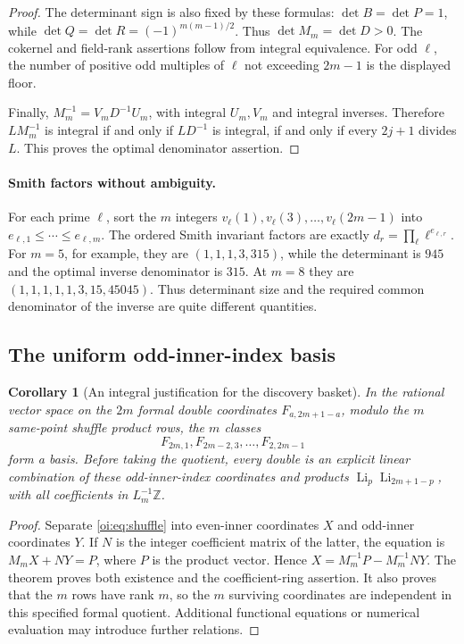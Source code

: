 \documentclass[11pt,letterpaper]{article}
\newtheorem{corollary}[theorem]{Corollary}
\theoremstyle{definition}
\theoremstyle{remark}
\begin{document}
\begin{proof}
The determinant sign is also fixed by these formulas:
$\det B=\det P=1$, while
$\det Q=\det R=(-1)^{m(m-1)/2}$.  Thus $\det M_m=\det D>0$.
The cokernel and field-rank assertions follow from integral equivalence.
For odd $\ell$, the number of positive odd multiples of $\ell$ not
exceeding $2m-1$ is the displayed floor.

Finally, $M_m^{-1}=V_mD^{-1}U_m$, with integral $U_m,V_m$ and integral
inverses.  Therefore $LM_m^{-1}$ is integral if and only if $LD^{-1}$
is integral, if and only if every $2j+1$ divides $L$.  This proves the
optimal denominator assertion.
\end{proof}

\paragraph{Smith factors without ambiguity.}
For each prime $\ell$, sort the $m$ integers
$v_\ell(1),v_\ell(3),\ldots,v_\ell(2m-1)$ into
$e_{\ell,1}\leq\cdots\leq e_{\ell,m}$.  The ordered Smith invariant
factors are exactly
$d_r=\prod_\ell\ell^{e_{\ell,r}}$.  For $m=5$, for example, they are
$(1,1,1,3,315)$, while the determinant is $945$ and the optimal inverse
denominator is $315$.  At $m=8$ they are
$(1,1,1,1,1,3,15,45045)$.  Thus determinant size and the required common
denominator of the inverse are quite different quantities.

\subsection{The uniform odd-inner-index basis}

\begin{corollary}[An integral justification for the discovery basket]
\label{oi:cor:basket}
In the rational vector space on the $2m$ formal double coordinates
$F_{a,2m+1-a}$, modulo the $m$ same-point shuffle product rows, the $m$
classes
\[
 F_{2m,1},F_{2m-2,3},\ldots,F_{2,2m-1}
\]
form a basis.  Before taking the quotient, every double is an explicit
linear combination of these odd-inner-index coordinates and products
$\operatorname{Li}_p\operatorname{Li}_{2m+1-p}$, with all coefficients
in $L_m^{-1}\mathbb Z$.
\end{corollary}
\begin{proof}
Separate \eqref{oi:eq:shuffle} into even-inner coordinates $X$ and
odd-inner coordinates $Y$.  If $N$ is the integer coefficient matrix
of the latter, the equation is $M_mX+NY=P$, where $P$ is the product
vector.  Hence $X=M_m^{-1}P-M_m^{-1}NY$.  The theorem proves both
existence and the coefficient-ring assertion.  It also proves that the
$m$ rows have rank $m$, so the $m$ surviving coordinates are independent
in this specified formal quotient.  Additional functional equations
or numerical evaluation may introduce further relations.
\end{proof}
\end{document}
